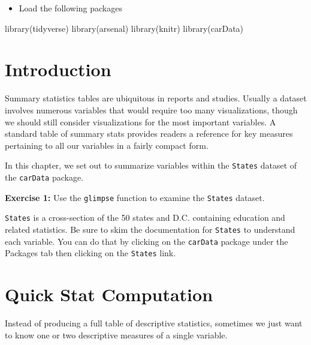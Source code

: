\documentclass[
]{book}
\makeatletter
\newenvironment{Shaded}{\begin{snugshade}}{\end{snugshade}}
\newcommand{\FunctionTok}[1]{\textcolor[rgb]{0,0,0}{#1}}
\newcommand{\NormalTok}[1]{#1}
\providecommand{\tightlist}{%
  \setlength{\itemsep}{0pt}\setlength{\parskip}{0pt}}
\newenvironment{kframe}{%
\medskip{}
\setlength{\fboxsep}{.8em}
 \def\at@end@of@kframe{}%
 \ifinner\ifhmode%
  \def\at@end@of@kframe{\end{minipage}}%
  \begin{minipage}{\columnwidth}%
 \fi\fi%
 \def\FrameCommand##1{\hskip\@totalleftmargin \hskip-\fboxsep
 \colorbox{shadecolor}{##1}\hskip-\fboxsep
     \hskip-\linewidth \hskip-\@totalleftmargin \hskip\columnwidth}%
 \MakeFramed {\advance\hsize-\width
   \@totalleftmargin\z@ \linewidth\hsize
   \@setminipage}}%
 {\par\unskip\endMakeFramed%
 \at@end@of@kframe}
\renewenvironment{Shaded}{\begin{kframe}}{\end{kframe}}
\newenvironment{rmdblock}[1]
  {\begin{shaded*}
  }
  {\end{shaded*}
  }
\newenvironment{learncheck}
  {\begin{rmdblock}{warning}}
  {\end{rmdblock}}
\makeatother
\begin{document}
\begin{itemize}
\tightlist
\item
  Load the following packages
\end{itemize}

\begin{Shaded}
\begin{Highlighting}[]
\FunctionTok{library}\NormalTok{(tidyverse)}
\FunctionTok{library}\NormalTok{(arsenal)}
\FunctionTok{library}\NormalTok{(knitr)}
\FunctionTok{library}\NormalTok{(carData)}
\end{Highlighting}
\end{Shaded}

\hypertarget{introduction}{%
\section{Introduction}\label{introduction}}

Summary statistics tables are ubiquitous in reports and studies. Usually a dataset involves numerous variables that would require too many visualizations, though we should still consider visualizations for the most important variables. A standard table of summary stats provides readers a reference for key measures pertaining to all our variables in a fairly compact form.

In this chapter, we set out to summarize variables within the \texttt{States} dataset of the \texttt{carData} package.

\begin{learncheck}
\textbf{Exercise 1:} Use the \texttt{glimpse} function to examine the
\texttt{States} dataset.
\end{learncheck}

\texttt{States} is a cross-section of the 50 states and D.C. containing education and related statistics. Be sure to skim the documentation for \texttt{States} to understand each variable. You can do that by clicking on the \texttt{carData} package under the Packages tab then clicking on the \texttt{States} link.

\hypertarget{quick-stat-computation}{%
\section{Quick Stat Computation}\label{quick-stat-computation}}

Instead of producing a full table of descriptive statistics, sometimes we just want to know one or two descriptive measures of a single variable.
\end{document}
